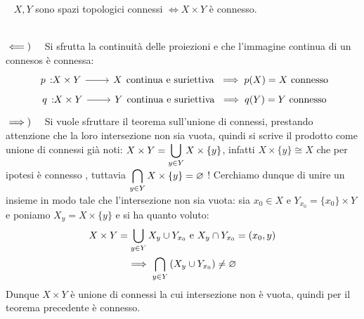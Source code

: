 \begin{theorema}~{}\label{prodotto connessi}
	$X, Y$ sono spazi topologici connessi $\iff X\times Y$ è connesso.	
\end{theorema}
\begin{demonstration}~{}\\
	$\impliedby)\quad$ Si sfrutta la continuità delle proiezioni e che l'immagine continua di un connesos è connessa:
		\begin{gather*}
			\funz p {X\times Y} X \text{continua e suriettiva } \implies p(X)=X \text{ connesso} \\
			\funz q {X\times Y} Y \text{continua e suriettiva } \implies q(Y)=Y \text{ connesso}	
		\end{gather*}	
	$\implies)\quad$ Si vuole sfruttare il teorema sull'unione di connessi, prestando attenzione che la loro intersezione non sia vuota, quindi si scrive il prodotto come unione di connessi già noti:
	$\displaystyle X\times Y=\mathop{{\bigcup}}\displaylimits_{y\in Y}X\times\{y\}$, infatti $X\times\{y\}\cong X$ che per ipotesi è connesso , tuttavia $\displaystyle\mathop{{\bigcap}}\displaylimits_{y\in Y}X\times\{y\}=\varnothing$ !\newline
	Cerchiamo dunque di unire un insieme in modo tale che l'intersezione non sia vuota: sia $x_0\in X$ e $Y_{x_0}=\{x_0\}\times Y$ e poniamo $X_y=X\times\{y\}$ e si ha quanto voluto:
		\begin{gather*}
			X\times Y=\mathop{{\bigcup}}\displaylimits_{y\in Y}X_y \cup Y_{x_0} \text{ e } X_y\cap Y_{x_0}=(x_0,y)\\
			\implies \mathop{{\bigcap}}\displaylimits_{y\in Y}\left( X_y  \cup Y_{x_0}\right)\neq\varnothing		
		\end{gather*}
	Dunque $X\times Y$ è unione di connessi la cui intersezione non è vuota, quindi per il teorema precedente è connesso.
\end{demonstration}
